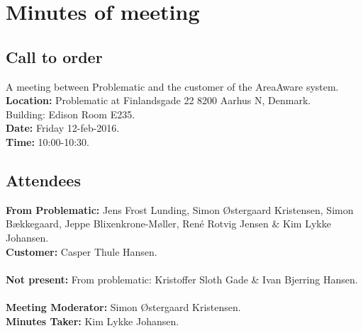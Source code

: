 %
\thispagestyle{fancy}
\chapter*{Minutes of meeting}

\section*{Call to order}
A meeting between Problematic and the customer of the AreaAware system.
\textbf{Location:} Problematic at Finlandsgade 22 8200 Aarhus N, Denmark.\\ Building: Edison Room E235.\\
\textbf{Date:} Friday 12-feb-2016. \\
\textbf{Time:} 10:00-10:30.

\section*{Attendees}
\textbf{From Problematic:} Jens Frost Lunding, Simon Østergaard Kristensen, Simon Bækkegaard, Jeppe Blixenkrone-Møller, René Rotvig Jensen \& Kim Lykke Johansen.\\
\textbf{Customer:} Casper Thule Hansen.\\\\
\textbf{Not present:} From problematic: Kristoffer Sloth Gade \& Ivan Bjerring Hansen.\\\\
\textbf{Meeting Moderator:} Simon Østergaard Kristensen.\\
\textbf{Minutes Taker:} Kim Lykke Johansen.

